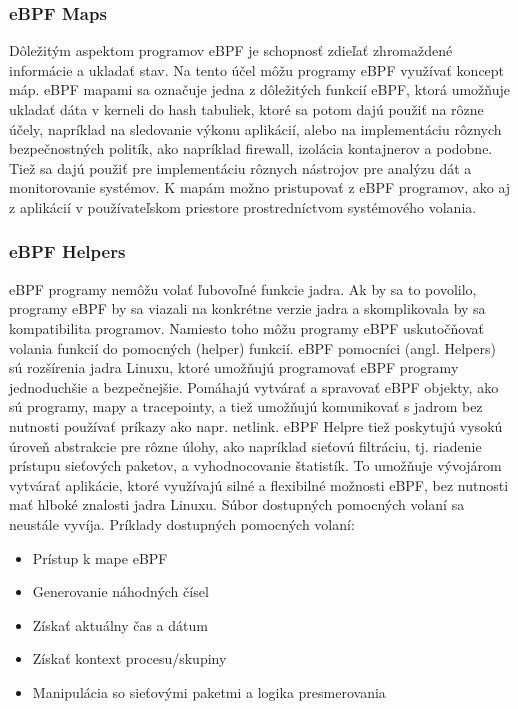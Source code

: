 \subsubsection{eBPF Maps}
Dôležitým aspektom programov eBPF je schopnosť zdieľať zhromaždené informácie a ukladať stav. Na tento účel môžu programy eBPF využívať koncept máp. 
eBPF mapami sa označuje jedna z dôležitých funkcií eBPF, ktorá umožňuje ukladať dáta v kerneli do hash tabuliek, ktoré sa potom dajú použiť na rôzne účely, 
napríklad na sledovanie výkonu aplikácií, alebo na implementáciu rôznych bezpečnostných politík, ako napríklad firewall, izolácia kontajnerov a podobne. 
Tiež sa dajú použiť pre implementáciu rôznych nástrojov pre analýzu dát a monitorovanie systémov. K mapám možno pristupovať z eBPF programov, 
ako aj z aplikácií v používateľskom priestore prostredníctvom systémového volania.

\subsubsection{eBPF Helpers}
eBPF programy nemôžu volať ľubovoľné funkcie jadra. Ak by sa to povolilo, programy eBPF by sa viazali na konkrétne verzie jadra a skomplikovala by sa 
kompatibilita programov. Namiesto toho môžu programy eBPF uskutočňovať volania funkcií do pomocných (helper) funkcií. eBPF pomocníci (angl. Helpers) 
sú rozšírenia jadra Linuxu, ktoré umožňujú programovať eBPF programy jednoduchšie a bezpečnejšie. Pomáhajú vytvárať a spravovať eBPF objekty, 
ako sú programy, mapy a tracepointy, a tiež umožňujú komunikovať s jadrom bez nutnosti používať príkazy ako napr. netlink. eBPF Helpre tiež 
poskytujú vysokú úroveň abstrakcie pre rôzne úlohy, ako napríklad sieťovú filtráciu, tj. riadenie prístupu sieťových paketov, a vyhodnocovanie štatistík. 
To umožňuje vývojárom vytvárať aplikácie, ktoré využívajú silné a flexibilné možnosti eBPF, bez nutnosti mať hlboké znalosti jadra Linuxu. 
Súbor dostupných pomocných volaní sa neustále vyvíja.
Príklady dostupných pomocných volaní:
\begin{itemize}
\item Prístup k mape eBPF
\item Generovanie náhodných čísel
\item Získať aktuálny čas a dátum
\item Získať kontext procesu/skupiny
\item Manipulácia so sieťovými paketmi a logika presmerovania
\end{itemize}

